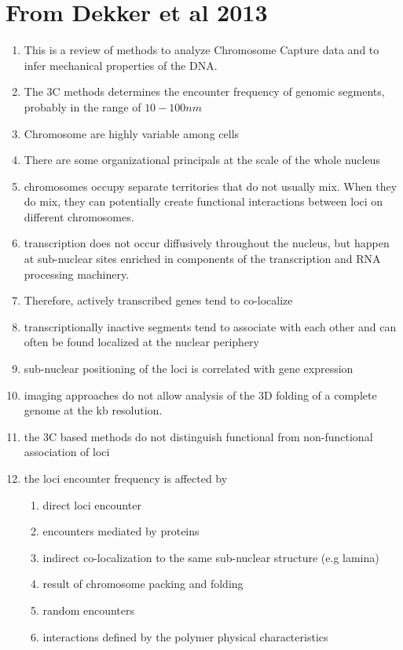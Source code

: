 \documentclass[12pt]{book}
\begin{document}
\section{From Dekker et al 2013 \cite{dekker2013exploring}}
\begin{enumerate}
\item This is a review of methods to analyze Chromosome Capture data and to infer mechanical properties of the DNA.
\item The 3C methods determines the encounter frequency of genomic segments, probably in the range of $10-100nm$
\item Chromosome are highly variable among cells \cite{muller2010stable}
\item There are some organizational principals at the scale of the whole nucleus
\item chromosomes occupy separate territories that do not usually mix\cite{marshall1997interphase}. When they do mix, they can potentially create functional interactions between loci on different chromosomes. 
\item transcription does not occur diffusively throughout the nucleus, but happen at sub-nuclear sites enriched in components of the transcription and RNA processing machinery.
\item Therefore, actively transcribed genes tend to co-localize
\item transcriptionally inactive segments tend to associate with each other and can often be found localized at the nuclear periphery
\item sub-nuclear positioning of the loci is correlated with gene expression
\item imaging approaches do not allow analysis of the 3D folding of a complete genome at the kb resolution. 
\item the 3C based methods do not distinguish functional from non-functional association of loci
\item the loci encounter frequency is affected by \begin{enumerate}
\item direct loci encounter
\item encounters mediated by proteins
\item indirect co-localization to the same sub-nuclear structure (e.g lamina)
\item result of chromosome packing and folding 
\item random encounters
\item interactions defined by the polymer physical characteristics

\end{enumerate}
\end{enumerate}
\end{document}
